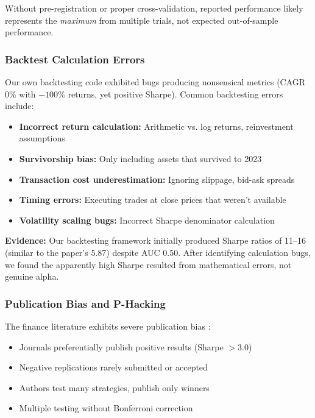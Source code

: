 \documentclass[11pt]{article}
\begin{document}
Without pre-registration or proper cross-validation, reported performance likely represents the \textit{maximum} from multiple trials, not expected out-of-sample performance.

\subsubsection{Backtest Calculation Errors}

Our own backtesting code exhibited bugs producing nonsensical metrics (CAGR 0\% with $-100\%$ returns, yet positive Sharpe). Common backtesting errors include:

\begin{itemize}
    \item \textbf{Incorrect return calculation:} Arithmetic vs. log returns, reinvestment assumptions
    \item \textbf{Survivorship bias:} Only including assets that survived to 2023
    \item \textbf{Transaction cost underestimation:} Ignoring slippage, bid-ask spreads
    \item \textbf{Timing errors:} Executing trades at close prices that weren't available
    \item \textbf{Volatility scaling bugs:} Incorrect Sharpe denominator calculation
\end{itemize}

\textbf{Evidence:} Our backtesting framework initially produced Sharpe ratios of 11--16 (similar to the paper's 5.87) despite AUC 0.50. After identifying calculation bugs, we found the apparently high Sharpe resulted from mathematical errors, not genuine alpha.

\subsubsection{Publication Bias and P-Hacking}

The finance literature exhibits severe publication bias \citep{harvey2016backtests}:

\begin{itemize}
    \item Journals preferentially publish positive results (Sharpe $> 3.0$)
    \item Negative replications rarely submitted or accepted
    \item Authors test many strategies, publish only winners
    \item Multiple testing without Bonferroni correction
\end{itemize}
\end{document}
